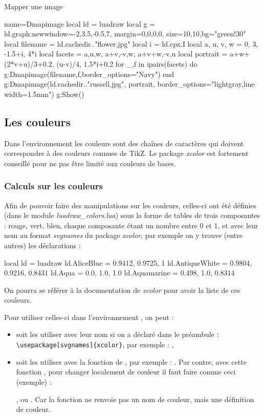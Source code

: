 \begin{demo}{Mapper une image}
\begin{luadraw}{name=Dmapimage}
local ld = luadraw
local g = ld.graph:new{window={-2,3.5,-0.5,7}, margin={0,0,0,0}, size={10,10},bg="green!30"}
local filename = ld.cachedir.."flower.jpg"
local i = ld.cpx.I
local a, u, v, w = 0, 3, -1.5+i, 4*i
local facets = {{a,u,w}, {a+v,-v,w}, {a+v+w,-v,u} }
local portrait = {a+w+(2*v+u)/3+0.2, (u-v)/4, 1.5*i+0.2}
for _,f in ipairs(facets) do
    g:Dmapimage(filename,f,{border_options="Navy"})
end
g:Dmapimage(ld.cachedir.."russell.jpg", portrait, {border_options="lightgray,line width=1.5mm"})
g:Show()
\end{luadraw}
\end{demo}


\subsection{Les couleurs}

Dans l'environnement \luadrawenv les couleurs sont des chaînes de caractères qui doivent correspondre à des couleurs connues de TikZ. Le package \emph{xcolor} est fortement conseillé pour ne pas être limité aux couleurs de bases.

\subsubsection{Calculs sur les couleurs}

Afin de pouvoir faire des manipulations sur les couleurs, celles-ci ont été définies (dans le module \emph{luadraw\_colors.lua}) sous la forme de tables de trois composantes : rouge, vert, bleu, chaque composante étant un nombre entre $0$ et $1$, et avec leur nom au format \emph{svgnames} du package \emph{xcolor}, par exemple on y trouve (entre autres) les déclarations :
\begin{Luacode}
local ld = luadraw
ld.AliceBlue = {0.9412, 0.9725, 1}
ld.AntiqueWhite = {0.9804, 0.9216, 0.8431}
ld.Aqua = {0.0, 1.0, 1.0}
ld.Aquamarine = {0.498, 1.0, 0.8314}
\end{Luacode}
On pourra se référer à la documentation de \emph{xcolor} pour avoir la liste de ces couleurs.

Pour utiliser celles-ci dans l'environnement \luadrawenv, on peut :
\begin{itemize}
    \item soit les utiliser avec leur nom si on a déclaré dans le préambule : \verb|\usepackage[svgnames]{xcolor}|, par exemple : ,
    
    \item soit les utiliser avec la fonction  de \luadrawenv, par exemple : . Par contre, avec cette fonction , pour changer localement de couleur il faut faire comme ceci (exemple) : \par
    , ou . Car la fonction  ne renvoie pas un nom de couleur, mais une définition de couleur.
\end{itemize}

